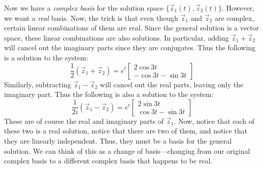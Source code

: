 \documentclass[addpoints,12pt]{exam}
\newcommand{\vv}[2]{\begin{bmatrix} #1 \\ #2 \end{bmatrix}}
\begin{document}
\begin{questions}
 Now we have a \emph{complex basis} for the solution space $\{\vec z_1(t),\vec z_2(t)\}$. However, we want a \emph{real} basis. Now, the trick is that even though $\vec z_1$ and $\vec z_2$ are complex, certain linear combinations of them are real. Since the general solution is a vector space, these linear combinations are also solutions. In particular, adding $\vec z_1+\vec z_2$ will cancel out the imaginary parts since they are conjugates. Thus the following is a solution to the system:
 $$\frac{1}{2}(\vec z_1+\vec z_2)=e^t\vv{2\cos3t}{-\cos3t-\sin3t}$$
 Similarly, subtracting $\vec z_1-\vec z_2$ will cancel out the real parts, leaving only the imaginary part. Thus the following is also a solution to the system:
 $$\frac{1}{2i}(\vec z_1-\vec z_2)=e^t\vv{2\sin3t}{\cos3t-\sin3t}$$
 These are of course the real and imaginary parts of $\vec z_1$. Now, notice that each of these two is a real solution, notice that there are two of them, and notice that they are linearly independent. Thus, they must be a basis for the general solution. We can think of this as a change of basis---changing from our original complex basis to a different complex basis that happens to be real.
\end{questions}
\end{document}
